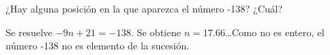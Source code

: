 \begin{multicols}{2}
\begin{parts}
        ¿Hay alguna posición en la que aparezca el número -138? ¿Cuál?

        \begin{solutionbox}{6em}
            Se resuelve $-9n + 21 = -138$. Se obtiene $n = 17.66$\dots Como no es entero, el
            número -138 no es elemento de la sucesión.
        \end{solutionbox}


    \end{parts}

\end{multicols}
